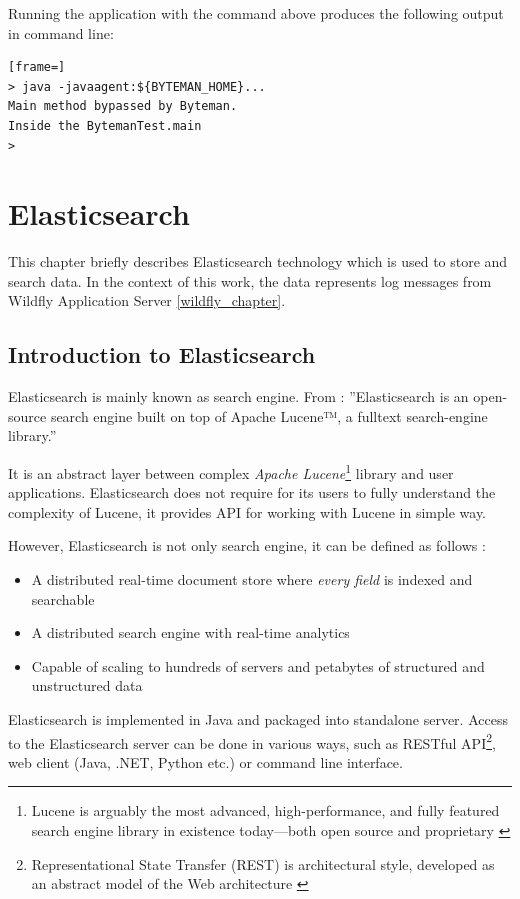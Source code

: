 \documentclass[12pt,oneside]{fithesis2}
\begin{document}
Running the application with the command above produces the following output in command line:
\begin{lstlisting}[frame=]
> java -javaagent:${BYTEMAN_HOME}...
Main method bypassed by Byteman.
Inside the BytemanTest.main
>
\end{lstlisting}

\chapter{Elasticsearch}
This chapter briefly describes Elasticsearch technology which is used to store and search data. In the context of this work, the data represents log messages from Wildfly Application Server \ref{wildfly_chapter}.

\section{Introduction to Elasticsearch}
Elasticsearch is mainly known as search engine. From \cite{elasticsearch_defnitive_guide}: ''Elasticsearch is an open-source search engine built on top of Apache Lucene™, a fulltext search-engine library.''

It is an abstract layer between complex \textit{Apache Lucene}\footnote{Lucene is arguably the most advanced, high-performance, and fully featured search engine library in existence today—both open source and proprietary \cite{elasticsearch_defnitive_guide}} library and user applications. Elasticsearch does not require for its users to fully understand the complexity of Lucene, it provides API for working with Lucene in simple way.

However, Elasticsearch is not only search engine, it can be defined as follows \cite{elasticsearch_defnitive_guide}:

\begin{itemize}
	\item A distributed real-time document store where \textit{every field} is indexed and searchable
	\item A distributed search engine with real-time analytics
	\item Capable of scaling to hundreds of servers and petabytes of structured and unstructured data
\end{itemize}

Elasticsearch is implemented in Java and packaged into standalone server. Access to the Elasticsearch server can be done in various ways, such as RESTful API\footnote{Representational State Transfer (REST) is architectural style, developed as an abstract model of the Web architecture \cite{rest}}, web client (Java, .NET, Python etc.) or command line interface.
\end{document}
